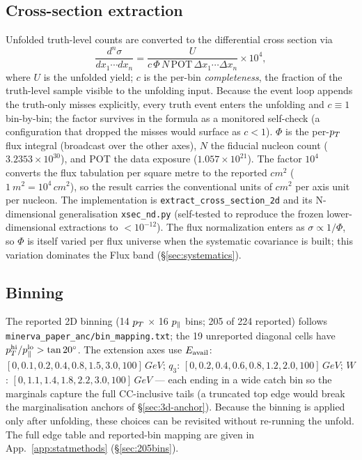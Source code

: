 \subsection{Cross-section extraction}
\label{sec:method-xsec}
Unfolded truth-level counts are converted to the differential cross section
via
\begin{equation*}
  \frac{d^{n}\sigma}{d x_{1}\cdots d x_{n}}
  = \frac{U}{c\,\Phi\,N\,\mathrm{POT}\,\Delta x_{1}\cdots\Delta x_{n}}
    \times 10^{4},
\end{equation*}
where $U$ is the unfolded yield; $c$ is the per-bin \emph{completeness}, the
fraction of the truth-level sample visible to the unfolding input. Because
the event loop appends the truth-only misses explicitly, every truth event
enters the unfolding and $c\equiv1$ bin-by-bin; the factor survives in the
formula as a monitored self-check (a configuration that dropped the misses
would surface as $c<1$). $\Phi$ is the per-$p_{T}$ flux
integral (broadcast over the other axes), $N$ the fiducial nucleon count
($3.2353\times10^{30}$), and POT the data exposure ($1.057\times10^{21}$).
The factor $10^{4}$ converts the flux tabulation per square metre to the
reported $\si{cm^2}$ ($\SI{1}{m^2}=10^{4}\,\si{cm^2}$), so the result
carries the conventional units of $\si{cm^2}$ per axis unit per nucleon.  The implementation is
\texttt{extract\_cross\_section\_2d} and its N-dimensional generalisation
\texttt{xsec\_nd.py} (self-tested to reproduce the frozen lower-dimensional
extractions to $<10^{-12}$). The flux normalization enters as
$\sigma\propto1/\Phi$, so $\Phi$ is itself varied per flux universe when
the systematic covariance is built; this variation dominates the Flux band
(\S\ref{sec:systematics}).

\subsection{Binning}
\label{sec:method-binning}
The reported 2D binning (14 $p_{T}$ $\times$ 16 $p_{\parallel}$ bins; 205 of 224
reported) follows \texttt{minerva\_paper\_anc/bin\_mapping.txt}; the 19
unreported diagonal cells have
$p_{T}^{\mathrm{hi}}/p_{\parallel}^{\mathrm{lo}}>\tan20^{\circ}$. The extension axes use
$E_{\mathrm{avail}}$: $[0,0.1,0.2,0.4,0.8,1.5,3.0,100]\,\si{GeV}$;
$q_{3}$: $[0,0.2,0.4,0.6,0.8,1.2,2.0,100]\,\si{GeV}$;
$W$: $[0,1.1,1.4,1.8,2.2,3.0,100]\,\si{GeV}$ --- each ending in a wide catch
bin so the marginals capture the full CC-inclusive tails (a truncated top edge
would break the marginalisation anchors of \S\ref{sec:3d-anchor}). Because the
binning is applied only after unfolding, these choices can be revisited
without re-running the unfold. The full edge table and reported-bin mapping
are given in App.~\ref{app:statmethods} (\S\ref{sec:205bins}).

